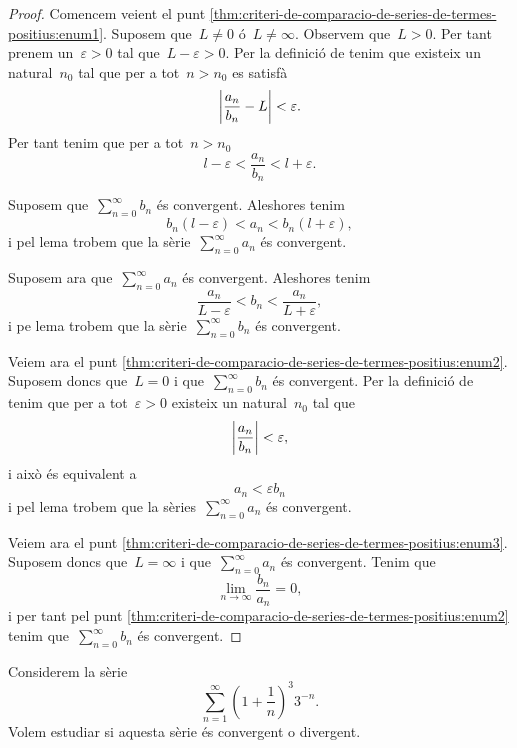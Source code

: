 \documentclass[../../main.tex]{subfiles}
\begin{document}
    \begin{proof}
        Comencem veient el punt \eqref{thm:criteri-de-comparacio-de-series-de-termes-positius:enum1}.
        Suposem que~\(L\neq0\) ó~\(L\neq\infty\).
        Observem que~\(L>0\).
        Per tant prenem un~\(\varepsilon>0\) tal que~\(L-\varepsilon>0\).
        Per la definició de  tenim que existeix un natural~\(n_{0}\) tal que per a tot~\(n>n_{0}\) es satisfà
        \[
            \abs{\frac{a_{n}}{b_{n}}-L}<\varepsilon.
        \]
        Per tant tenim que per a tot~\(n>n_{0}\)
        \[
            l-\varepsilon<\frac{a_{n}}{b_{n}}<l+\varepsilon.
        \]

        Suposem que~\(\sum_{n=0}^{\infty}b_{n}\) és convergent.
        Aleshores tenim
        \[
            b_{n}(l-\varepsilon)<a_{n}<b_{n}(l+\varepsilon),
        \]
        i pel lema  trobem que la sèrie~\(\sum_{n=0}^{\infty}a_{n}\) és convergent.

        Suposem ara que~\(\sum_{n=0}^{\infty}a_{n}\) és convergent.
        Aleshores tenim
        \[
            \frac{a_{n}}{L-\varepsilon}<b_{n}<\frac{a_{n}}{L+\varepsilon},
        \]
        i pe lema  trobem que la sèrie~\(\sum_{n=0}^{\infty}b_{n}\) és convergent.

        Veiem ara el punt \eqref{thm:criteri-de-comparacio-de-series-de-termes-positius:enum2}.
        Suposem doncs que~\(L=0\) i que~\(\sum_{n=0}^{\infty}b_{n}\) és convergent.
        Per la definició de  tenim que per a tot~\(\varepsilon>0\) existeix un natural~\(n_{0}\) tal que
        \[
            \abs{\frac{a_{n}}{b_{n}}}<\varepsilon,
        \]
        i això és equivalent a
        \[
            a_{n}<\varepsilon b_{n}
        \]
        i pel lema  trobem que la sèries~\(\sum_{n=0}^{\infty}a_{n}\) és convergent.

        Veiem ara el punt \eqref{thm:criteri-de-comparacio-de-series-de-termes-positius:enum3}.
        Suposem doncs que~\(L=\infty\) i que~\(\sum_{n=0}^{\infty}a_{n}\) és convergent.
        Tenim que
        \[
            \lim_{n\to\infty}\frac{b_{n}}{a_{n}}=0,
        \] %
        i per tant pel punt \eqref{thm:criteri-de-comparacio-de-series-de-termes-positius:enum2} tenim que~\(\sum_{n=0}^{\infty}b_{n}\) és convergent.
    \end{proof}
    \begin{example}
        Considerem la sèrie
        \[
            \sum_{n=1}^{\infty}\left(1+\frac{1}{n}\right)^{3}3^{-n}.
        \]
        Volem estudiar si aquesta sèrie és convergent o divergent.
    \end{example}
\end{document}
